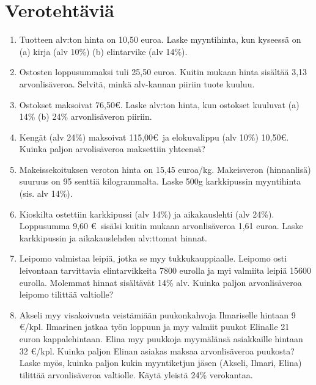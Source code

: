 \documentclass[a4paper,10pt]{article}
\begin{document}
\pagestyle{empty}

\section*{Verotehtäviä}

\begin{enumerate}
\subsubsection*{Arvonlisävero}
\item Tuotteen alv:ton hinta on 10,50 euroa. Laske myyntihinta, kun kyseessä on (a) kirja (alv 10\%) (b) elintarvike (alv 14\%).

\item Ostosten loppusummaksi tuli 25,50 euroa. Kuitin mukaan hinta sisältää 3,13 arvonlisäveroa. Selvitä, minkä alv-kannan piiriin tuote kuuluu.

\item  Ostokset maksoivat 76,50\euro. Laske alv:ton hinta, kun ostokset kuuluvat (a) 14\% (b) 24\% arvonlisäveron piiriin.

\item Kengät (alv 24\%) maksoivat 115,00\euro\ ja elokuvalippu (alv 10\%) 10,50\euro. Kuinka paljon arvolisäveroa maksettiin yhteensä?

\item Makeissekoituksen veroton hinta on 15,45 euroa/kg. Makeisveron (hinnanlisä) suuruus on 95 senttiä kilogrammalta. Laske 500g karkkipussin myyntihinta (sis. alv 14\%).

\item Kioskilta ostettiin karkkipussi (alv 14\%) ja aikakauslehti (alv 24\%). Loppusumma 9,60 \euro\ sisälsi kuitin mukaan arvonlisäveroa 1,61 euroa. Laske karkkipussin ja aikakauslehden alv:ttomat hinnat.

\item Leipomo valmistaa leipiä, jotka se myy tukkukauppiaalle. Leipomo osti leivontaan tarvittavia elintarvikkeita 7800 eurolla ja myi valmiita leipiä 15600 eurolla. Molemmat hinnat sisältävät 14\% alv. Kuinka paljon arvonlisäveroa leipomo tilittää  valtiolle?


\item Akseli myy visakoivusta veistämiään puukonkahvoja Ilmariselle hintaan 9 \euro/kpl. Ilmarinen jatkaa työn loppuun ja myy valmiit puukot Elinalle 21 euron kappalehintaan. Elina myy puukkoja myymälänsä asiakkaille hintaan 32 \euro/kpl. Kuinka paljon Elinan asiakas maksaa arvonlisäveroa puukosta? Laske myös, kuinka paljon kukin myyntiketjun jäsen (Akseli, Ilmari, Elina) tilittää arvonlisäveroa valtiolle. Käytä yleistä 24\% verokantaa.



\end{enumerate}
\end{document}
